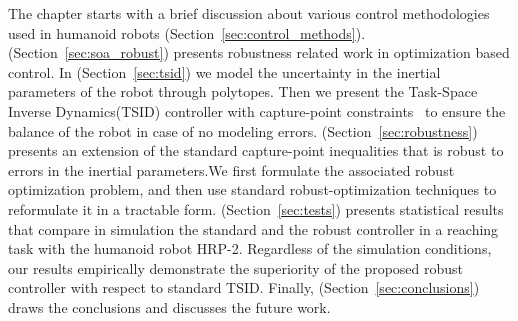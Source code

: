 The chapter starts with a brief discussion about various control methodologies used in humanoid robots (Section~\ref{sec:control_methods}). (Section~\ref{sec:soa_robust}) presents robustness related work in optimization based control. In (Section~\ref{sec:tsid}) we model the uncertainty in the inertial parameters of the robot through polytopes. Then we present the Task-Space Inverse Dynamics(TSID) controller with capture-point constraints~\cite{Ramos2014a} to ensure the balance of the robot in case of no modeling errors. (Section~\ref{sec:robustness}) presents an extension of the standard capture-point inequalities that is robust to errors in the inertial parameters.We first formulate the associated robust optimization problem, and then use standard robust-optimization techniques to reformulate it in a tractable form. (Section~\ref{sec:tests}) presents statistical results that compare in simulation the standard and the robust controller in a reaching task with the humanoid robot HRP-2. Regardless of the simulation conditions, our results empirically demonstrate the superiority of the proposed robust controller with respect to standard TSID. Finally, (Section~\ref{sec:conclusions}) draws the conclusions and discusses the future work.

